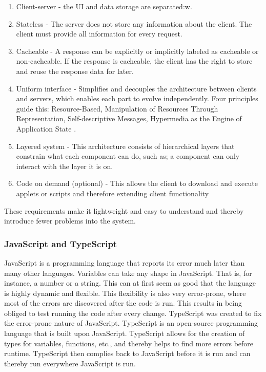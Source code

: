 \begin{enumerate}
  \item Client-server - the UI and data storage are separated:w. 
  \item Stateless - The server does not store any information about the client. The client must provide all information for every request. 
  \item Cacheable - A response can be explicitly or implicitly labeled as cacheable or non-cacheable. If the response is cacheable, the client has the right to store and reuse the response data for later. 
  \item Uniform interface - Simplifies and decouples the architecture between clients and servers, which enables each part to evolve independently. Four principles guide this: Resource-Based, Manipulation of Resources Through Representation, Self-descriptive Messages, Hypermedia as the Engine of Application State\cite{WhatREST} . 
  \item Layered system - This architecture consists of hierarchical layers that constrain what each component can do, such as; a component can only interact with the layer it is on. 
  \item Code on demand (optional) - This allows the client to download and execute applets or scripts and therefore extending client functionality 
\end{enumerate}

These requirements make it lightweight and easy to understand and thereby introduce fewer problems into the system. 


\subsubsection{JavaScript and TypeScript}%
\label{ssub:JavaScript and TypeScript}

JavaScript is a programming language that reports its error much later than many other languages. Variables can take any shape in JavaScript. That is, for instance, a number or a string. This can at first seem as good that the language is highly dynamic and flexible. This flexibility is also very error-prone, where most of the errors are discovered after the code is run. This results in being obliged to test running the code after every change\cite{taivalsaari2008web}. TypeScript was created to fix the error-prone nature of JavaScript. TypeScript is an open-source programming language that is built upon JavaScript. TypeScript allows for the creation of types for variables, functions, etc., and thereby helps to find more errors before runtime\cite{WhyYouShould}. TypeScript then complies back to JavaScript before it is run and can thereby run everywhere JavaScript is run\cite{WhyYouShould}.  


